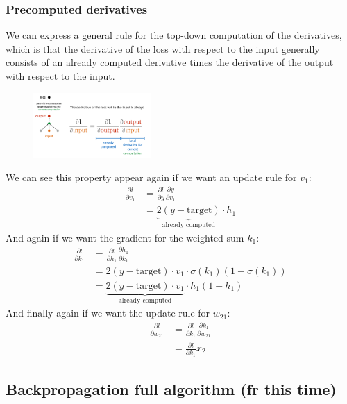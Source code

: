 \documentclass[12pt]{article}
\begin{document}
\subsubsection*{Precomputed derivatives}

We can express a general rule for the top-down computation of the derivatives, which is that the derivative of the loss with respect to the input generally consists of an already computed derivative times the derivative of the output with respect to the input.
\begin{figure}[!h]
    \centering
    \includegraphics[width=0.4\textwidth]{assets/generalrule.png}
\end{figure}

We can see this property appear again if we want an update rule for $v_1$:
\begin{align*}
    \frac{\partial l}{\partial v_1} & = \frac{\partial l}{\partial y}\frac{\partial y}{\partial v_1} \\
    & = \underbrace{2(y - \text{target})}_\text{already computed}\cdot h_1
\end{align*}
And again if we want the gradient for the weighted sum $k_1$:
\begin{align*}
    \frac{\partial l}{\partial k_1} & = \frac{\partial l}{\partial h_1}\frac{\partial h_1}{\partial k_1} \\
    & = 2(y - \text{target})\cdot v_1\cdot \sigma(k_1)(1-\sigma(k_1)) \\ 
    & = \underbrace{2(y - \text{target})\cdot v_1}_\text{already computed}\cdot h_1(1-h_1)
\end{align*}
And finally again if we want the update rule for $w_{21}$: 
\begin{align*}
    \frac{\partial l}{\partial w_{21}} & = \frac{\partial l}{\partial k_1}\frac{\partial k_1}{\partial w_{21}} \\
    & = \frac{\partial l}{\partial k_1}x_2
\end{align*}

\subsection{Backpropagation full algorithm (fr this time)}
\end{document}
